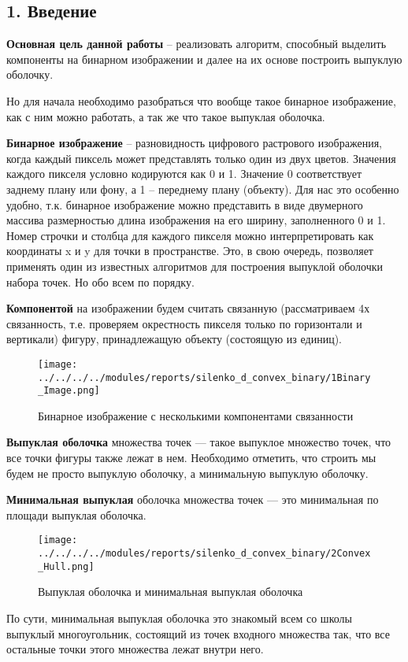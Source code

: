 \documentclass{report}
\begin{document}
\setcounter{page}{2}
\tableofcontents

\newpage


\begin{center}
\section*{1. Введение}
\end{center}
\par \textbf{Основная цель данной работы} – реализовать алгоритм, способный выделить компоненты на бинарном изображении и далее на их основе построить выпуклую оболочку.
\par Но для начала необходимо разобраться что вообще такое бинарное изображение, как с ним можно работать, а так же что такое выпуклая оболочка.
\par \textbf{Бинарное изображение} – разновидность цифрового растрового изображения, когда каждый пиксель может представлять только один из двух цветов. Значения каждого пикселя условно кодируются как 0 и 1. Значение 0 соответствует заднему плану или фону, а 1 – переднему плану (объекту). Для нас это особенно удобно, т.к. бинарное изображение можно представить в виде двумерного массива размерностью длина изображения на его ширину, заполненного 0 и 1. Номер строчки и столбца для каждого пикселя можно интерпретировать как координаты x и y для точки в пространстве. Это, в свою очередь, позволяет применять один из известных алгоритмов для построения выпуклой оболочки набора точек. Но обо всем по порядку. 
\par \textbf{Компонентой} на изображении будем считать связанную (рассматриваем 4х связанность, т.е. проверяем окрестность пикселя только по горизонтали и вертикали) фигуру, принадлежащую объекту (состоящую из единиц). 
\begin{figure}[htbp]
  \centering
  \texttt{[image: ../../../../modules/reports/silenko\_d\_convex\_binary/1Binary\_Image.png]}
  \caption{Бинарное изображение с несколькими компонентами связанности}\label{fig:../../../../modules/reports/silenko_d_convex_binary/1Binary_Image.png}
\end{figure}
\par \textbf{Выпуклая оболочка} множества точек — такое выпуклое множество точек, что все точки фигуры также лежат в нем. Необходимо отметить, что строить мы будем не просто выпуклую оболочку, а минимальную выпуклую оболочку.
\par \textbf{Минимальная выпуклая} оболочка множества точек — это минимальная по площади выпуклая оболочка.
\begin{figure}[htbp]
  \centering
  \texttt{[image: ../../../../modules/reports/silenko\_d\_convex\_binary/2Convex\_Hull.png]}
  \caption{Выпуклая оболочка и минимальная выпуклая оболочка}\label{fig:../../../../modules/reports/silenko_d_convex_binary/2Convex_Hull.png}
\end{figure}
\par По сути, минимальная выпуклая оболочка это знакомый всем со школы выпуклый многоугольник, состоящий из точек входного множества так, что все остальные точки этого множества лежат внутри него.
 
\end{document}
